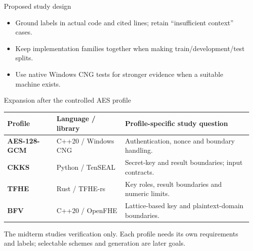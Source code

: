\documentclass[aspectratio=169,10pt]{beamer}
\begin{document}
\begin{frame}{Proposed study design}
\centering
{}
\vspace{1.2em}
\begin{itemize}
\item Ground labels in actual code and cited lines; retain ``insufficient context'' cases.
\item Keep implementation families together when making train/development/test splits.
\item Use native Windows CNG tests for stronger evidence when a suitable machine exists.
\end{itemize}
\end{frame}

\begin{frame}{Expansion after the controlled AES profile}
\small
\begin{tabularx}{\textwidth}{>{\bfseries}p{2.5cm}p{3.2cm}X}
\toprule
Profile & Language / library & Profile-specific study question \\
\midrule
AES-128-GCM & C++20 / Windows CNG & Authentication, nonce and boundary handling. \\
CKKS & Python / TenSEAL & Secret-key and result boundaries; input contracts. \\
TFHE & Rust / TFHE-rs & Key roles, result boundaries and numeric limits. \\
BFV & C++20 / OpenFHE & Lattice-based key and plaintext-domain boundaries. \\
\bottomrule
\end{tabularx}
\vspace{0.7em}
\alert{The midterm studies verification only. Each profile needs its own requirements and labels; selectable schemes and generation are later goals.}
\end{frame}
\end{document}

